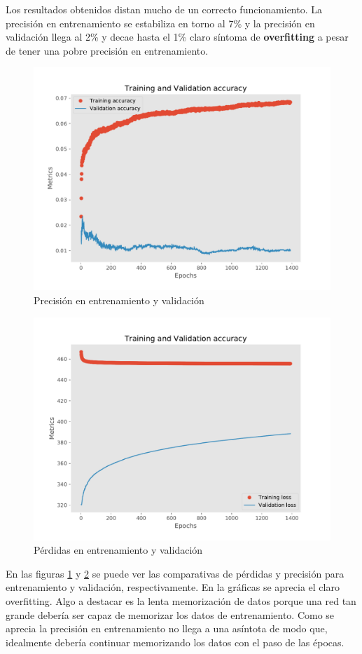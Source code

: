 Los resultados obtenidos distan mucho de un correcto funcionamiento. La precisión en entrenamiento se estabiliza en torno al 7\% y la precisión en validación llega al 2\% y decae hasta el 1\% claro síntoma de \textbf{overfitting} a pesar de tener una pobre precisión en entrenamiento.

\begin{figure}[h!]
	\centering
	\includegraphics[width=0.75\columnwidth]{figures/one_to_one_results_acc.pdf}
	\caption{Precisión en entrenamiento y validación}
	\label{fig: results_acc}
\end{figure}
\begin{figure}[t!]
	\centering
	\includegraphics[width=0.75\columnwidth]{figures/one_to_one_results_loss.pdf}
	\caption{Pérdidas en entrenamiento y validación}
	\label{fig: results_loss}
\end{figure}

En las figuras \ref{fig: results_acc} y \ref{fig: results_loss} se puede ver las comparativas de pérdidas y precisión para entrenamiento y validación, respectivamente. En la gráficas se aprecia el claro overfitting. Algo a destacar es la lenta memorización de datos porque una red tan grande debería ser capaz de memorizar los datos de entrenamiento. Como se aprecia la precisión en entrenamiento no llega a una asíntota de modo que, idealmente debería continuar memorizando los datos con el paso de las épocas.

